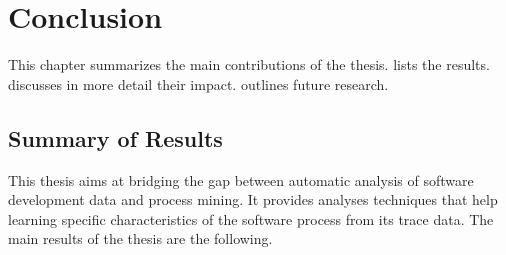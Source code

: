 \chapter{Conclusion}
\label{ch9-conclusion}

This chapter summarizes the main contributions of the thesis.  lists the results.  discusses in more detail their impact.  outlines future research. 

\section{Summary of Results}
\label{sec:summary-of-results}

This thesis aims at bridging the gap between automatic analysis of software development data and process mining. It provides analyses techniques that help learning specific characteristics of the software process from its trace data. The main results of the thesis are the following.


